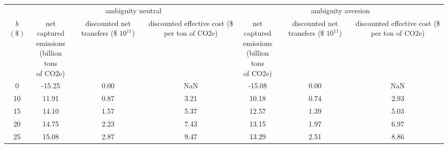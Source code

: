 
\begin{tabular}[t]{ccccccc}
\toprule

& \multicolumn{3}{c}{ambiguity neutral} & \multicolumn{3}{c}{ambiguity aversion} \\
\cmidrule[1pt](r){2-4} \cmidrule[1pt](r){5-7} 
 \makecell[c]{$b$ \\ $(\$)$} & \makecell[c]{net captured \\ emissions \\ (billion tons \\ of CO2e)} & \makecell[c]{discounted \\net transfers \\ \\ (\$ $10^{11}$)} & \makecell[c]{discounted \\ effective cost \\ (\$ per ton \\ of CO2e)} &
\makecell[c]{net captured \\ emissions \\ (billion tons \\ of CO2e)} & \makecell[c]{discounted \\net transfers \\ \\ (\$ $10^{11}$)} & \makecell[c]{discounted \\ effective cost \\ (\$ per ton \\ of CO2e)}\\
\midrule



  0 &   -15.25 &   0.00 &       NaN & -15.08 &   0.00 &       NaN \\
 10  &  11.91 &   0.87&  3.21 &  10.18 &   0.74&  2.93 \\
15 &  14.10 &   1.57 &  5.37 &   12.57 &   1.39 &  5.03 \\
  20 &  14.75 &   2.23 &  7.43 &   13.15 &   1.97 &  6.97 \\
 25 &  15.08 &   2.87 &  9.47 &  13.29 &   2.51&  8.86 \\

\bottomrule
\end{tabular}
